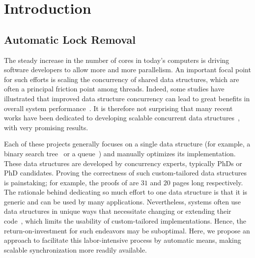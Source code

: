 
\section{Introduction} \label{sec:intro}

\subsection{Automatic Lock Removal}
The steady increase in the number of cores in today's computers is driving software developers to allow more and more parallelism.
An important focal point for such efforts is scaling the concurrency of shared data structures, which are often a principal friction point among threads. Indeed, some studies have illustrated that improved data structure concurrency can lead to  
great benefits in overall system performance~\cite{clsm,more}.  
It is therefore not surprising that many recent works have been dedicated to developing scalable concurrent data structures~\cite{ArbelA2014,DrachslerVY2014,NatarajanM2014,BrownER2014,CrainGR2013,BraginskyP2012,
AfekKKMT2012,EllenFRB2010,BronsonCCO2010,HerlihyLLS2007,Michael:1996}, with very promising results.

Each of these projects generally focuses on a single data
structure (for example, a binary search tree~\cite{ArbelA2014} or a queue~\cite{Michael:1996}) and manually optimizes its implementation. These data structures are developed by concurrency experts, typically PhDs or PhD candidates. 
Proving the correctness of such custom-tailored data structures is painstaking; 
for example, the proofs of \cite{BraginskyP2012,EllenFRB2010} are $31$ and $20$ pages long
respectively. 
The rationale behind dedicating so much effort to one data structure is that it is  
generic and can be used by many applications. Nevertheless,  systems often use data structures in unique ways 
that necessitate changing or extending their code~\cite{levelDB,more}, which limits the usability of custom-tailored
implementations. Hence, the return-on-investment for such endeavors may be suboptimal. 
Here, we propose an approach to facilitate this labor-intensive process by automatic means,
making scalable synchronization more readily available. 

